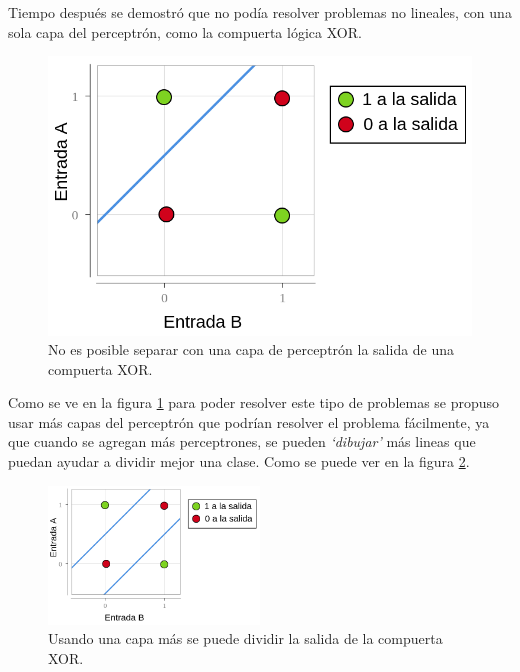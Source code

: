 \par Tiempo después se demostró que no podía resolver problemas no lineales, con una sola capa del perceptrón, como la compuerta lógica XOR.
\begin{figure}[H]
	\begin{minipage}{0.5\textwidth}
		
	\end{minipage}%
	\begin{minipage}{0.5\textwidth}
		\includegraphics[width=\textwidth]{imagenes/diagramaXor.png}
	\end{minipage}
	\caption{No es posible separar con una capa de perceptrón la salida de una compuerta XOR.}
	\label{fig:xor}
\end{figure}


\par Como se ve en la figura \ref{fig:xor} para poder resolver este tipo de problemas se propuso usar más capas del perceptrón que podrían resolver el problema fácilmente, ya que cuando se agregan más perceptrones, se pueden \textit{`dibujar'} más lineas que puedan ayudar a dividir mejor una clase. Como se puede ver en la figura \ref{fig:xor2}.

\begin{figure}[H]
	\centering
	\includegraphics[width=0.5\textwidth]{imagenes/diagramaXor2.png}
	\caption{Usando una capa más se puede dividir la salida de la compuerta XOR.}
	\label{fig:xor2}
\end{figure}

